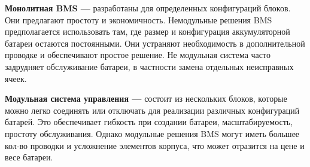 \textbf{Монолитная BMS ---} разработаны для определенных конфигураций блоков. Они предлагают простоту и экономичность. 
Немодульные решения BMS предполагается использовать там, где размер и конфигурация аккумуляторной батареи остаются постоянными. 
Они устраняют необходимость в дополнительной проводке и обеспечивают простое решение. 
Не модульная система часто задрудняет обслуживание батареи, в частности замена отдельных неисправных ячеек.

\textbf{Модульная система управления ---} состоит из нескольких блоков, которые можно легко соединять или отключать для реализации различных конфигураций батарей. 
Это обеспечивает гибкость при создании батареи, масштабируемость, простоту обслуживания.
Однако модульные решения BMS могут иметь большее кол-во проводки и усложнение элементов корпуса, что может отразится на цене и весе батареи.

